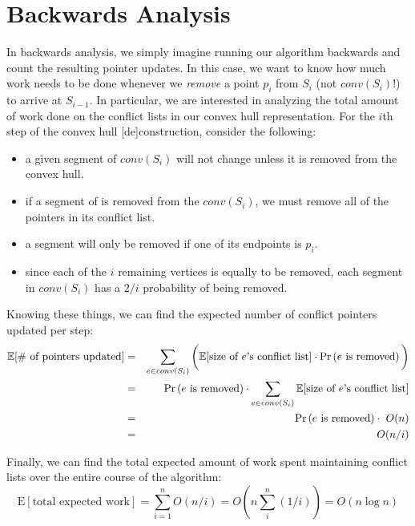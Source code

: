 \documentclass{article}
\renewcommand{\Pr}[1]{\textrm{\textup{Pr}}\left( #1 \right)}
\begin{document}
\section{Backwards Analysis}
In backwards analysis, we simply imagine running our algorithm backwards and count the resulting pointer updates.  In this case, 
we want to know how much work needs to be done whenever we \emph{remove} a point $p_{i}$ from $S_{i}$ (not $conv(S_{i})$!) to 
arrive at $S_{i-1}$.  In particular, we are interested in analyzing the total amount of work done on the conflict lists in our 
convex hull representation.  For the $i$th step of the convex hull [de]construction, consider the following:
\begin{itemize}
\item a given segment of $conv(S_{i})$ will not change unless it is removed from the convex hull.
\item if a segment of is removed from the $conv(S_{i})$, we must remove all of the pointers in its conflict list.
\item a segment will only be removed if one of its endpoints is $p_{i}$.
\item since each of the $i$ remaining vertices is equally to be removed, each segment in $conv(S_{i})$ has a $2/i$ probability of being removed.
\end{itemize}
Knowing these things, we can find the expected number of conflict pointers updated per step:
\begin{eqnarray*}
\mathbb{E}[\#~\mbox{of pointers updated}] &=& 
\sum_{e \in conv(S_{i})}\bigg(\mathbb{E}[\mbox{size of }e\mbox{'s conflict list}]\cdot\Pr{{e~\mbox{is removed}}}\bigg)\\
&=& \Pr{{e~\mbox{is removed}}} \cdot \sum_{e \in conv(S_{i})}\mathbb{E}[\mbox{size of }e\mbox{'s conflict list}]\\
&=& \Pr{{e~\mbox{is removed}}} \cdot ~ O(n)\\
&=& O(n/i)\\
\end{eqnarray*}

Finally, we can find the total expected amount of work spent maintaining conflict lists over the entire course of the algorithm:
$$\mbox{E}[\mbox{total expected work}] = \sum_{i=1}^{n} O(n/i) = O\left(n \sum_{i}^{n} (1/i)\right) = O(n \log{n})$$
\end{document}
